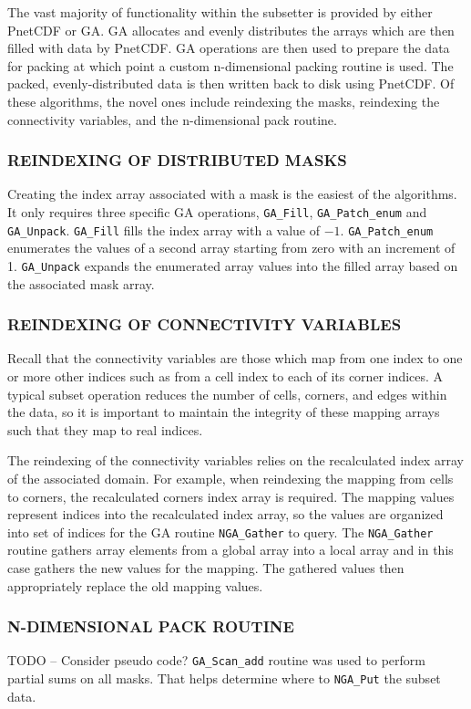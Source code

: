 The vast majority of functionality within the subsetter is provided by either
PnetCDF or GA.  GA allocates and evenly distributes the arrays which are then
filled with data by PnetCDF.  GA operations are then used to prepare the data
for packing at which point a custom n-dimensional packing routine is used.
The packed, evenly-distributed data is then written back to disk using
PnetCDF.  Of these algorithms, the novel ones include reindexing the masks,
reindexing the connectivity variables, and the n-dimensional pack routine.

\subsubsection{REINDEXING OF DISTRIBUTED MASKS}

Creating the index array associated with a mask is the easiest of the
algorithms.  It only requires three specific GA operations, \verb=GA_Fill=,
\verb=GA_Patch_enum= and \verb=GA_Unpack=.  \verb=GA_Fill= fills the index
array with a value of $-1$.  \verb=GA_Patch_enum= enumerates the values of a
second array starting from zero with an increment of 1.  \verb=GA_Unpack=
expands the enumerated array values into the filled array based on the
associated mask array.

\subsubsection{REINDEXING OF CONNECTIVITY VARIABLES}

Recall that the connectivity variables are those which map from one index to
one or more other indices such as from a cell index to each of its corner
indices.  A typical subset operation reduces the number of cells, corners, and
edges within the data, so it is important to maintain the integrity of these
mapping arrays such that they map to real indices.

The reindexing of the connectivity variables relies on the recalculated index
array of the associated domain.  For example, when reindexing the mapping from
cells to corners, the recalculated corners index array is required.  The
mapping values represent indices into the recalculated index array, so the
values are organized into set of indices for the GA routine \verb=NGA_Gather=
to query.  The \verb=NGA_Gather= routine gathers array elements from a global
array into a local array and in this case gathers the new values for the
mapping.  The gathered values then appropriately replace the old mapping
values.

\subsubsection{N-DIMENSIONAL PACK ROUTINE}

TODO -- Consider pseudo code?  \verb=GA_Scan_add= routine was used to perform
partial sums on all masks. That helps determine where to \verb=NGA_Put= the
subset data.
